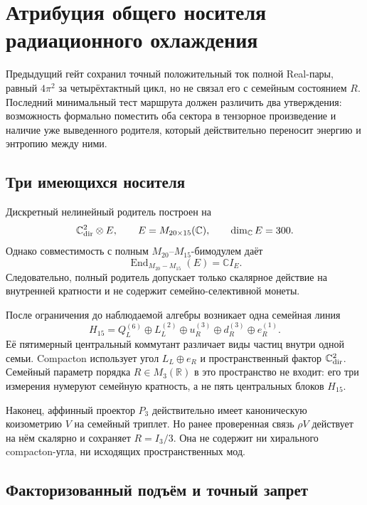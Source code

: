 \chapter{Атрибуция общего носителя радиационного охлаждения}

Предыдущий гейт сохранил точный положительный ток полной Real-пары,
равный $4\pi^2$ за четырёхтактный цикл, но не связал его с семейным
состоянием $R$. Последний минимальный тест маршрута должен различить два
утверждения: возможность формально поместить оба сектора в тензорное
произведение и наличие уже выведенного родителя, который действительно
переносит энергию и энтропию между ними.

\section{Три имеющихся носителя}

Дискретный нелинейный родитель построен на
\begin{equation}
 \mathbb C^2_{\rm dir}\otimes E,
 \qquad E=M_{20\times15}(\mathbb C),
 \qquad \dim_{\mathbb C}E=300.
\end{equation}
Однако совместимость с полным $M_{20}$--$M_{15}$-бимодулем даёт
\begin{equation}
 \operatorname{End}_{M_{20}-M_{15}}(E)=\mathbb C I_E.
 \label{eq:v6-common-carrier-full-commutant}
\end{equation}
Следовательно, полный родитель допускает только скалярное действие на
внутренней кратности и не содержит семейно-селективной монеты.

После ограничения до наблюдаемой алгебры возникает одна семейная линия
\begin{equation}
 H_{15}=Q_L^{(6)}\oplus L_L^{(2)}\oplus u_R^{(3)}
 \oplus d_R^{(3)}\oplus e_R^{(1)}.
\end{equation}
Её пятимерный центральный коммутант различает виды частиц внутри одной
семьи. Compacton использует угол $L_L\oplus e_R$ и пространственный
фактор $\mathbb C^2_{\rm dir}$. Семейный параметр порядка
$R\in M_3(\mathbb R)$ в это пространство не входит: его три измерения
нумеруют семейную кратность, а не пять центральных блоков $H_{15}$.

Наконец, аффинный проектор $P_3$ действительно имеет каноническую
коизометрию $V$ на семейный триплет. Но ранее проверенная связь $\rho V$
действует на нём скалярно и сохраняет $R=I_3/3$. Она не содержит ни
хирального compacton-угла, ни исходящих пространственных мод.

\section{Факторизованный подъём и точный запрет}

